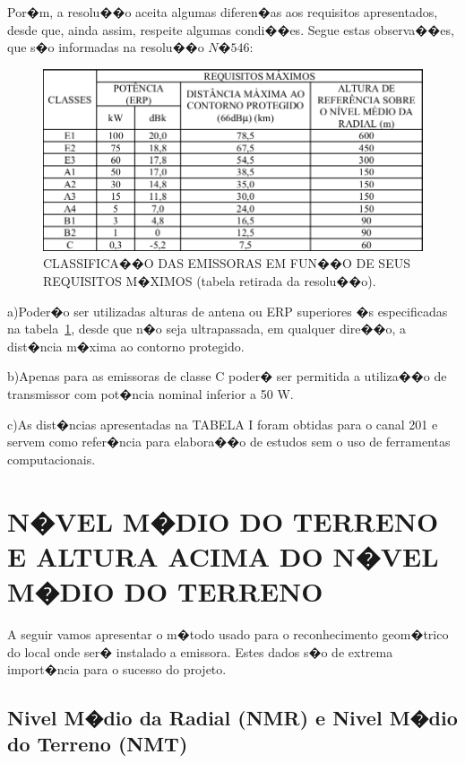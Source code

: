 Por�m, a resolu��o aceita algumas diferen�as aos requisitos apresentados, desde que, ainda assim, respeite algumas condi��es. Segue estas observa��es, 
que s�o 
informadas na resolu��o $N� 546$:

\begin{figure}[!htb]
\centering
\includegraphics[scale=.5]{./figuras/tabelaClassificacaoEmissoras.png} 
\caption{CLASSIFICA��O DAS EMISSORAS
EM FUN��O DE SEUS REQUISITOS M�XIMOS
(tabela retirada da resolu��o).}
\label{tabelaClassificacaoEmissoras}
\end{figure}

a)Poder�o ser utilizadas alturas de antena ou ERP superiores �s
especificadas na tabela~\ref{tabelaClassificacaoEmissoras}, desde que n�o seja ultrapassada, em
qualquer dire��o, a dist�ncia m�xima ao contorno protegido.

b)Apenas para as emissoras de classe C poder� ser permitida a utiliza��o de
transmissor com pot�ncia nominal inferior a 50 W.

c)As dist�ncias apresentadas na TABELA I foram obtidas para o canal 201
e servem como refer�ncia para elabora��o de estudos sem o uso de
ferramentas computacionais.

\section{N�VEL M�DIO DO TERRENO E ALTURA ACIMA DO N�VEL M�DIO DO TERRENO}

A seguir vamos apresentar o m�todo usado para o reconhecimento geom�trico do local onde ser� instalado a emissora.
Estes dados s�o de extrema import�ncia para o sucesso do projeto.

\subsection{Nivel M�dio da Radial (NMR) e Nivel M�dio do Terreno (NMT)}

